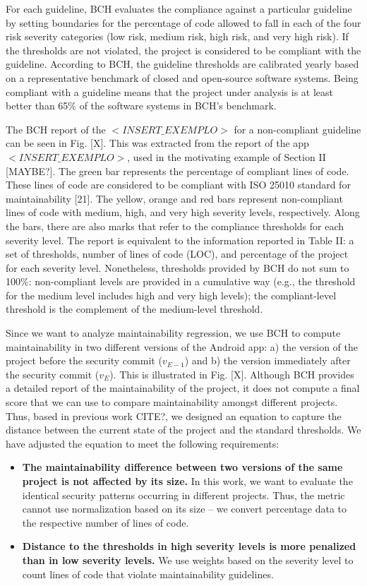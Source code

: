 \documentclass[10pt,conference]{IEEEtran}
\begin{document}
For each guideline, BCH evaluates the compliance against a particular guideline by setting boundaries for the percentage of code allowed to fall in each of the four risk severity categories (low risk, medium risk, high risk, and very high risk). If the thresholds are not violated, the project is considered to be compliant with the guideline. According to BCH, the guideline thresholds are calibrated yearly based on a representative benchmark of closed and open-source software systems. Being compliant with a guideline means that the project under analysis is at least better than 65\% of the software systems in BCH’s benchmark.

The BCH report of the $<INSERT\_EXEMPLO>$ for a non-compliant guideline can be seen in Fig. [X]. This was extracted from the report of the app $<INSERT\_EXEMPLO>$, used in the motivating example of Section II [MAYBE?]. The green bar represents the percentage of compliant lines of code. These lines of code are considered to be compliant with ISO 25010 standard for maintainability [21]. The yellow, orange and red bars represent non-compliant lines of code with medium, high, and very high severity levels, respectively. Along the bars, there are also marks that refer to the compliance thresholds for each severity level. The report is equivalent to the information reported in Table II: a set of thresholds, number of lines of code (LOC), and percentage of the project for each severity level. Nonetheless, thresholds provided by BCH do not sum to 100\%: non-compliant levels are provided in a cumulative way (e.g., the threshold for the medium level includes high and very high levels); the compliant-level threshold is the complement of the medium-level threshold.

Since we want to analyze maintainability regression, we
use BCH to compute maintainability in two different versions of the Android app: a) the version of the project before the security commit ($v_{E-1}$) and b) the version immediately after the security commit ($v_E$). This is illustrated in Fig. [X].
Although BCH provides a detailed report of the maintainability of the project, it does not compute a final score that we can use to compare maintainability amongst different projects. Thus, based in previous work CITE?, we designed an equation to capture the distance between the current state of the project and the standard thresholds. We have adjusted the equation to meet the following requirements:

\begin{itemize}
	\item \textbf{The maintainability difference between two versions of the same project is not affected by its size.} In this work, we want to evaluate the identical security patterns occurring in different projects. Thus, the metric cannot use normalization based on its size – we convert percentage data to the respective number of lines of code.
	\item \textbf{Distance to the thresholds in high severity levels is more penalized than in low severity levels.} We use weights based on the severity level to count lines of code that violate maintainability guidelines.
\end{itemize}
\end{document}
